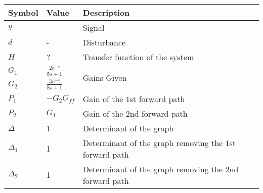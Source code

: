 \begin{tabular} {|m{8ex}|m{8ex}|m{17ex}|}
    \hline
    \textbf{Symbol} & \textbf{Value} & \textbf{Description} \\[1.5ex]
    \hline
    $y$ & - & Signal  \\[1.5ex]
    \hline 
    $d$ & - & Disturbance \\[1.5ex]
    \hline
    $H$ & ? & Transfer function of the system\\
    \hline
    $G_1$ & ${\frac{2e^{-s}}{5s+1}}$ & \multirow{2}{*}{Gains Given} \\[2ex]
    \cline{1-2}
    $G_2$ & ${\frac{3e^{-s}}{8s+1}}$ & \\[2ex]
    \hline
    $P_1$ & $-G_2G_{ff}$ &  Gain of the $1$st forward path\\
    \hline 
    $P_2$ & $G_1$ &  Gain of the $2$nd forward path\\
    \hline 
    $\Delta$ & 1 & Determinant of the graph\\
    \hline 
    $\Delta_1$ & 1 & Determinant of the graph removing the $1$st forward path\\
    \hline
    $\Delta_2$ & 1 & Determinant of the graph removing the $2$nd forward path\\
    \hline
    \end{tabular}